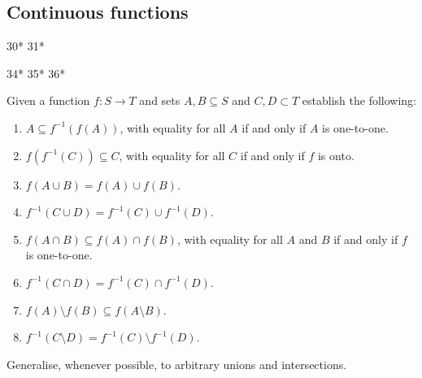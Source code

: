 \subsection{Continuous functions}

30*
31*

34*
35*
36*

\begin{exercise}{1}
Given a function $f:S\to T$ and sets $A,B\subseteq S$ and $C,D\subset T$ establish the following:
\begin{enumerate}
    \item $A \subseteq f^{-1}(f(A))$, with equality for all $A$ if and only if $A$ is one-to-one.
    \item $f(f^{-1}(C))\subseteq C$, with equality for all $C$ if and only if $f$ is onto.
    \item $f(A\cup B)= f(A)\cup f(B)$.
    \item $f^{-1}(C\cup D)=f^{-1}(C)\cup f^{-1}(D)$.
    \item $f(A\cap B)\subseteq f(A)\cap f(B)$, with equality for all $A$ and $B$ if and only if $f$ is one-to-one.
    \item $f^{-1}(C\cap D)=f^{-1}(C)\cap f^{-1}(D)$.
    \item $f(A)\setminus f(B)\subseteq f(A\setminus B)$.
    \item $f^{-1}(C\setminus D)= f^{-1}(C)\setminus f^{-1}(D)$.
\end{enumerate}
Generalise, whenever possible, to arbitrary unions and intersections.
\end{exercise}
